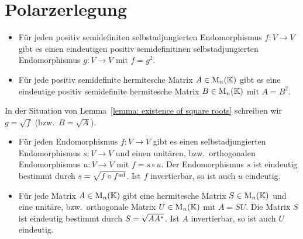 \section{Polarzerlegung}

\begin{lemma}
  \label{lemma: existence of square roots}
  \leavevmode
  \begin{itemize}
    \item
      Für jeden positiv semidefiniten selbstadjungierten Endomorphismus $f \colon V \to V$ gibt es einen eindeutigen positiv semidefinitinen selbstadjungierten Endomorphismus $g \colon V \to V$ mit $f = g^2$.
    \item
      Für jede positiv semidefinite hermitesche Matrix $A \in \operatorname{M}_{n}(\mathbb{K})$ gibt es eine eindeutige positiv semidefinite hermitesche Matrix $B \in \operatorname{M}_{n}(\mathbb{K})$ mit $A = B^2$.
  \end{itemize}
\end{lemma}

In der Situation von Lemma~\ref{lemma: existence of square roots} schreiben wir $g = \sqrt{f}$ (bzw.\ $B = \sqrt{A}$).

\begin{theorem}[Polarzerlegung]
  \leavevmode
  \begin{itemize}
    \item
      Für jeden Endomorphismus $f \colon V \to V$ gibt es einen selbstadjungierten Endomorphismus $s \colon V \to V$ und einen unitären, bzw.\ orthogonalen Endomorphismus $u \colon V \to V$ mit $f = s \circ u$.
      Der Endomorphismus $s$ ist eindeutig bestimmt durch $s = \sqrt{f \circ f^{\operatorname{ad}}}$.
      Ist $f$ invertierbar, so ist auch $u$ eindeutig.
    
    \item
      Für jede Matrix $A \in \operatorname{M}_{n}(\mathbb{K})$ gibt eine hermitesche Matrix $S \in \operatorname{M}_{n}(\mathbb{K})$ und eine unitäre, bzw.\ orthogonale Matrix $U \in \operatorname{M}_{n}(\mathbb{K})$ mit $A = SU$.
      Die Matrix $S$ ist eindeutig bestimmt durch $S = \sqrt{A A^*}$.
      Ist $A$ invertierbar, so ist auch $U$ eindeutig.
  \end{itemize}
\end{theorem}




